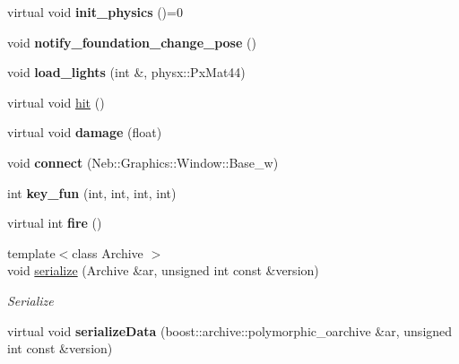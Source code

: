 \begin{DoxyCompactItemize}
\item 
\hypertarget{classNeb_1_1Actor_1_1Base_a84a52d4a51117c510336bcad075f63d1}{virtual void {\bfseries init\-\_\-physics} ()=0}\label{classNeb_1_1Actor_1_1Base_a84a52d4a51117c510336bcad075f63d1}

\item 
\hypertarget{classNeb_1_1Actor_1_1Base_a5b5263db439a6cc2614268dd9058d302}{void {\bfseries notify\-\_\-foundation\-\_\-change\-\_\-pose} ()}\label{classNeb_1_1Actor_1_1Base_a5b5263db439a6cc2614268dd9058d302}

\item 
\hypertarget{classNeb_1_1Actor_1_1Base_a1952504069949fa29f53137cfe762274}{void {\bfseries load\-\_\-lights} (int \&, physx\-::\-Px\-Mat44)}\label{classNeb_1_1Actor_1_1Base_a1952504069949fa29f53137cfe762274}

\item 
virtual void \hyperlink{classNeb_1_1Actor_1_1Base_afc072654755bb4db2e1af77a55e7f8dd}{hit} ()
\item 
\hypertarget{classNeb_1_1Actor_1_1Base_aa8065352d9f093036db30ea7a4e04828}{virtual void {\bfseries damage} (float)}\label{classNeb_1_1Actor_1_1Base_aa8065352d9f093036db30ea7a4e04828}

\item 
\hypertarget{classNeb_1_1Actor_1_1Base_a342125bda2f491723ffc0199eea4f675}{void {\bfseries connect} (Neb\-::\-Graphics\-::\-Window\-::\-Base\-\_\-w)}\label{classNeb_1_1Actor_1_1Base_a342125bda2f491723ffc0199eea4f675}

\item 
\hypertarget{classNeb_1_1Actor_1_1Base_a02cc601e428cea2f36c5b8f58bf31749}{int {\bfseries key\-\_\-fun} (int, int, int, int)}\label{classNeb_1_1Actor_1_1Base_a02cc601e428cea2f36c5b8f58bf31749}

\item 
\hypertarget{classNeb_1_1Actor_1_1Base_aa7001c8845e41342c9b01a190c6026a1}{virtual int {\bfseries fire} ()}\label{classNeb_1_1Actor_1_1Base_aa7001c8845e41342c9b01a190c6026a1}

\item 
{\footnotesize template$<$class Archive $>$ }\\void \hyperlink{classNeb_1_1Actor_1_1Base_a1b1e7cf679c2cb84e532deed6a2ec90c}{serialize} (Archive \&ar, unsigned int const \&version)
\begin{DoxyCompactList}\small\item\em Serialize \end{DoxyCompactList}\item 
\hypertarget{classNeb_1_1Actor_1_1Base_a910522bc6cc99e63fda53c9c46555204}{virtual void {\bfseries serialize\-Data} (boost\-::archive\-::polymorphic\-\_\-oarchive \&ar, unsigned int const \&version)}\label{classNeb_1_1Actor_1_1Base_a910522bc6cc99e63fda53c9c46555204}


\end{DoxyCompactItemize}
